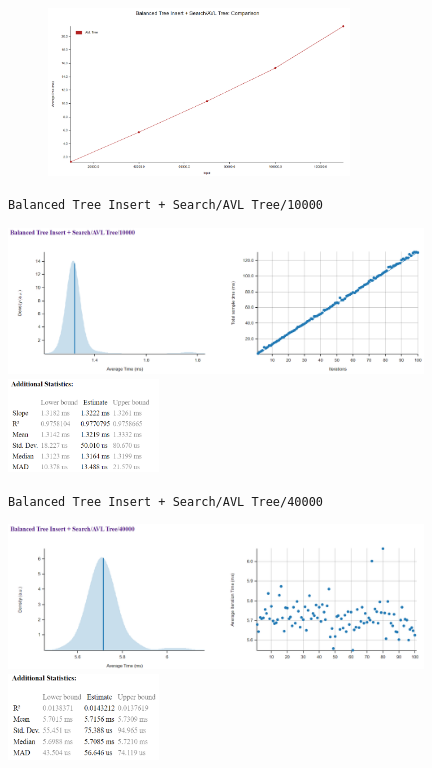 \documentclass[11pt, letterpaper]{article}
\begin{document}
\begin{figure}[htbp]
    \centering
    \includegraphics[width=8cm]{benchmarks/AVL/line.png}
    \label{Line_AVL}
\end{figure}
\newpage
\texttt{Balanced Tree Insert + Search/AVL Tree/10000}
\begin{paracol}{3}
    \centering        
    \includegraphics[width=11cm]{benchmarks/AVL/10000/plots.png}
    \switchcolumn
    \vspace*{\fill}
    \includegraphics[width=4cm]{benchmarks/AVL/10000/stats.png}
    \vspace*{\fill}
\end{paracol}

\texttt{Balanced Tree Insert + Search/AVL Tree/40000}
\begin{paracol}{3}
    \centering        
    \includegraphics[width=11cm]{benchmarks/AVL/40000/plots.png}
    \switchcolumn
    \vspace*{\fill}
    \includegraphics[width=4cm]{benchmarks/AVL/40000/stats.png}
    \vspace*{\fill}
\end{paracol}
\end{document}
